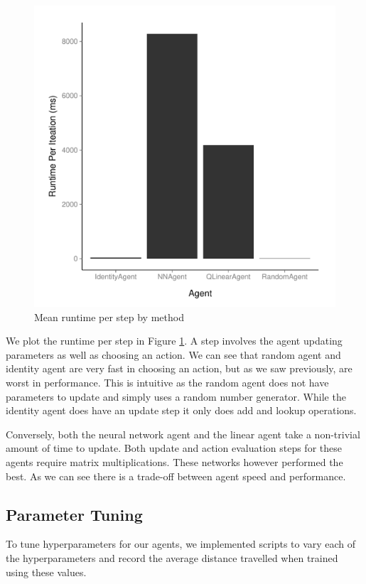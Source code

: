 \documentclass[12pt]{article}
\begin{document}
\begin{figure}
\includegraphics[scale=0.5]{imgs/runtime_bar.pdf}
\caption{Mean runtime per step by method}
\label{runtime_bar}
\end{figure}

We plot the runtime per step in Figure \ref{runtime_bar}. A step involves the agent updating parameters as well as choosing an action. We can see that random agent and identity agent are very fast in choosing an action, but as we saw previously, are worst in performance. This is intuitive as the random agent does not have parameters to update and simply uses a random number generator. While the identity agent does have an update step it only does add and lookup operations.

Conversely, both the neural network agent and the linear agent take a non-trivial amount of time to update. Both update and action evaluation steps for these agents require matrix multiplications. These networks however performed the best. As we can see there is a trade-off between agent speed and performance.

\subsection{Parameter Tuning}

To tune hyperparameters for our agents, we implemented scripts to vary each of the hyperparameters and record the average distance travelled when trained using these values. 
\end{document}
